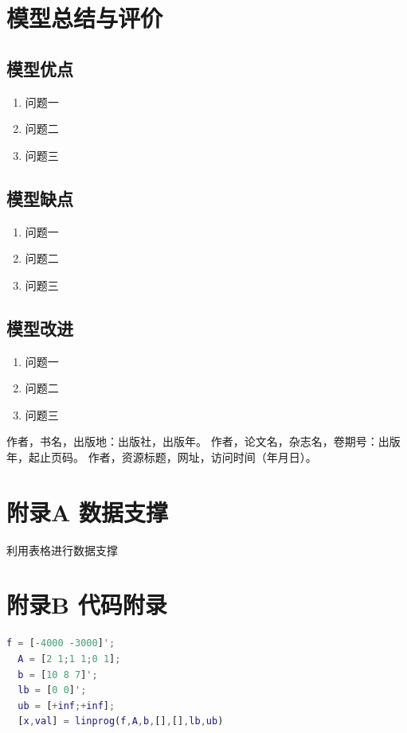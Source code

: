 \documentclass[12pt,a4paper]{article}
\numberwithin{figure}{subsection}
\numberwithin{figure}{subsection}
\begin{document}
\section{模型总结与评价}
\subsection{模型优点}
\begin{enumerate}[itemsep=-0.2em,topsep=0em]
  \item 问题一
  \item 问题二
  \item 问题三
\end{enumerate}

\subsection{模型缺点}
\begin{enumerate}[itemsep=-0.2em,topsep=0em]
  \item 问题一
  \item 问题二
  \item 问题三
\end{enumerate}

\subsection{模型改进}
\begin{enumerate}[itemsep=-0.2em,topsep=0em]
  \item 问题一
  \item 问题二
  \item 问题三
\end{enumerate}

\newpage
\begin{thebibliography}{99}
\songti
{} 作者，书名，出版地：出版社，出版年。
 作者，论文名，杂志名，卷期号：出版年，起止页码。
 作者，资源标题，网址，访问时间（年月日）。
\end{thebibliography}

\newpage
\section*{附录A 数据支撑}
利用表格进行数据支撑
\section*{附录B 代码附录}
\begin{lstlisting}[language=Matlab]
  f = [-4000 -3000]';
  A = [2 1;1 1;0 1];
  b = [10 8 7]';
  lb = [0 0]';
  ub = [+inf;+inf];
  [x,val] = linprog(f,A,b,[],[],lb,ub)
  \end{lstlisting}
\end{document}
